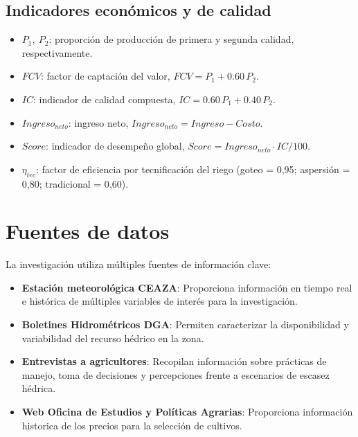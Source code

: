 \documentclass[12pt]{report}
\begin{document}
\subsection*{Indicadores económicos y de calidad}

\begin{itemize}
    \item $P_1,\ P_2$: proporción de producción de primera y segunda calidad, respectivamente.
    \item $FCV$: factor de captación del valor, $FCV = P_1 + 0.60\,P_2$.
    \item $IC$: indicador de calidad compuesta, $IC = 0.60\,P_1 + 0.40\,P_2$.
    \item $Ingreso_{neto}$: ingreso neto, $Ingreso_{neto} = Ingreso - Costo$.
    \item $Score$: indicador de desempeño global, $Score = Ingreso_{neto}\cdot IC/100$.
    \item $\eta_{tec}$: factor de eficiencia por tecnificación del riego (goteo = 0{,}95; aspersión = 0{,}80; tradicional = 0{,}60).
\end{itemize}
\section{Fuentes de datos}

La investigación utiliza múltiples fuentes de información clave:

\begin{itemize}
    \item \textbf{Estación meteorológica CEAZA}: Proporciona información en tiempo real e histórica de múltiples variables de interés para la investigación. 
    
    \item \textbf{Boletines Hidrométricos DGA}: Permiten caracterizar la disponibilidad y variabilidad del recurso hédrico en la zona.
    
    \item \textbf{Entrevistas a agricultores}: Recopilan información sobre prácticas de manejo, toma de decisiones y percepciones frente a escenarios de escasez hédrica. 
    
    \item \textbf{Web Oficina de Estudios y Políticas Agrarias}: Proporciona información historica de los precios para la selección de cultivos.
    
\end{itemize}
\end{document}
